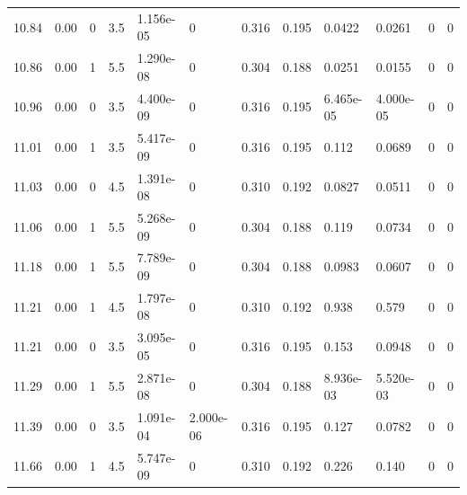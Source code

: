 \documentclass[preview]{standalone}
\begin{document}
{{{\begin{tabular}{L{1.2cm}C{1.2cm} C{0.3cm}C{0.5cm} C{1.4cm}C{1.4cm} C{1.4cm}C{1.4cm} C{1.6cm}C{1.6cm} C{1.6cm}C{1.6cm}}
  10.84  &  0.00  & 0     & 3.5 &  1.156e-05  & 0  &  0.316&   0.195& 0.0422 & 0.0261   &  0 & 0  \\ 
  10.86  &  0.00  & 1     & 5.5 &  1.290e-08  & 0  &  0.304&   0.188& 0.0251 & 0.0155   &  0 & 0  \\ 
  10.96  &  0.00  & 0     & 3.5 &  4.400e-09  & 0  &  0.316&   0.195& 6.465e-05 & 4.000e-05   &  0 & 0  \\ 
  11.01  &  0.00  & 1     & 3.5 &  5.417e-09  & 0  &  0.316&   0.195& 0.112 & 0.0689   &  0 & 0  \\ 
  11.03  &  0.00  & 0     & 4.5 &  1.391e-08  & 0  &  0.310&   0.192& 0.0827 & 0.0511   &  0 & 0  \\ 
  11.06  &  0.00  & 1     & 5.5 &  5.268e-09  & 0  &  0.304&   0.188& 0.119 & 0.0734   &  0 & 0  \\ 
  11.18  &  0.00  & 1     & 5.5 &  7.789e-09  & 0  &  0.304&   0.188& 0.0983 & 0.0607   &  0 & 0  \\ 
  11.21  &  0.00  & 1     & 4.5 &  1.797e-08  & 0  &  0.310&   0.192& 0.938 & 0.579   &  0 & 0  \\ 
  11.21  &  0.00  & 0     & 3.5 &  3.095e-05  & 0  &  0.316&   0.195& 0.153 & 0.0948   &  0 & 0  \\ 
  11.29  &  0.00  & 1     & 5.5 &  2.871e-08  & 0  &  0.304&   0.188& 8.936e-03 & 5.520e-03   &  0 & 0  \\ 
  11.39  &  0.00  & 0     & 3.5 &  1.091e-04  & 2.000e-06  &  0.316&   0.195& 0.127 & 0.0782   &  0 & 0  \\ 
  11.66  &  0.00  & 1     & 4.5 &  5.747e-09  & 0  &  0.310&   0.192& 0.226 & 0.140   &  0 & 0  \\ 
\hline 
\end{tabular} 

}}}
\end{document}
